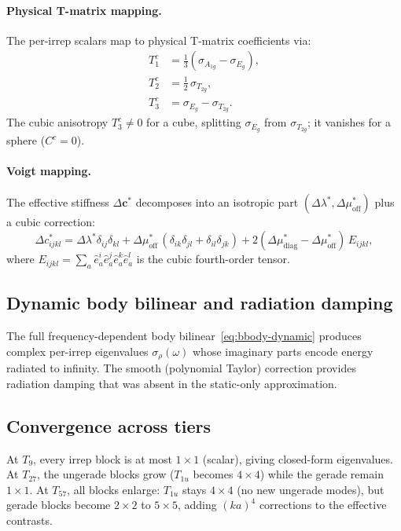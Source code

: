 \documentclass[11pt,a4paper]{article}
\newcommand{\D}{\Delta}
\theoremstyle{plain}
\theoremstyle{definition}
\theoremstyle{remark}
\begin{document}
\paragraph{Physical T-matrix mapping.}
The per-irrep scalars map to physical T-matrix coefficients via:
\begin{align}
  T_1^c &= \tfrac{1}{3}(\sigma_{A_{1g}} - \sigma_{E_g}),
    \label{eq:T1c-map}\\
  T_2^c &= \tfrac{1}{2}\,\sigma_{T_{2g}},
    \label{eq:T2c-map}\\
  T_3^c &= \sigma_{E_g} - \sigma_{T_{2g}}.
    \label{eq:T3c-map}
\end{align}
The cubic anisotropy $T_3^c \neq 0$ for a cube, splitting
$\sigma_{E_g}$ from $\sigma_{T_{2g}}$; it vanishes for a sphere
($C^c = 0$).

\paragraph{Voigt mapping.}
The effective stiffness $\D\mathbf{c}^*$ decomposes into an isotropic
part $(\D\lambda^*, \D\mu^*_\mathrm{off})$ plus a cubic correction:
\begin{equation}
  \D c^*_{ijkl}
  = \D\lambda^*\delta_{ij}\delta_{kl}
  + \D\mu^*_\mathrm{off}\,(\delta_{ik}\delta_{jl} + \delta_{il}\delta_{jk})
  + 2(\D\mu^*_\mathrm{diag} - \D\mu^*_\mathrm{off})\,E_{ijkl},
  \label{eq:Dc-cubic}
\end{equation}
where $E_{ijkl} = \sum_a \hat{e}_a^i\hat{e}_a^j\hat{e}_a^k\hat{e}_a^l$
is the cubic fourth-order tensor.

\subsection{Dynamic body bilinear and radiation damping}

The full frequency-dependent body bilinear~\eqref{eq:bbody-dynamic}
produces complex per-irrep eigenvalues $\sigma_\rho(\omega)$ whose
imaginary parts encode energy radiated to infinity.  The smooth
(polynomial Taylor) correction provides radiation damping that was
absent in the static-only approximation.

\subsection{Convergence across tiers}

At $T_9$, every irrep block is at most $1\times 1$ (scalar), giving
closed-form eigenvalues.  At $T_{27}$, the ungerade blocks grow
($T_{1u}$ becomes $4\times 4$) while the gerade remain $1\times 1$.
At $T_{57}$, all blocks enlarge: $T_{1u}$ stays $4\times 4$ (no new
ungerade modes), but gerade blocks become $2\times 2$ to $5\times 5$,
adding $(ka)^4$ corrections to the effective contrasts.
\end{document}
